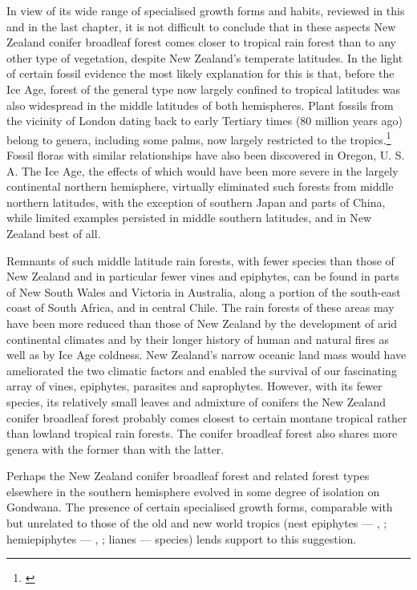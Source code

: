 In view of its wide range of specialised growth forms and habits, reviewed in this and in the last chapter, it is not difficult to conclude that in these aspects New Zealand conifer broadleaf forest comes closer to tropical rain forest than to any other type of vegetation, despite New Zealand's temperate latitudes.
In the light of certain fossil evidence the most likely explanation for this is that, before the Ice Age, forest of the general type now largely confined to tropical latitudes was also widespread in the middle latitudes of both hemispheres.
Plant fossils from the vicinity of London dating back to early Tertiary times (80 million years ago) belong to genera, including some palms, now largely restricted to the tropics.\footnote{\cite{chandler1964lower}}
Fossil floras with similar relationships have also been discovered in Oregon, U.
S.
A.
The Ice Age, the effects of which would have been more severe in the largely continental northern hemisphere, virtually eliminated such forests from middle northern latitudes, with the exception of southern Japan and parts of China, while limited examples persisted in middle southern latitudes, and in New Zealand best of all.

Remnants of such middle latitude rain forests, with fewer species than those of New Zealand and in particular fewer vines and epiphytes, can be found in parts of New South Wales and Victoria in Australia, along a portion of the south-east coast of South Africa, and in central Chile.
The rain forests of these areas may have been more reduced than those of New Zealand by the development of arid continental climates and by their longer history of human and natural fires as well as by Ice Age coldness.
New Zealand's narrow oceanic land mass would have ameliorated the two climatic factors and enabled the survival of our fascinating array of vines, epiphytes, parasites and saprophytes.
However, with its fewer species, its relatively small leaves and admixture of conifers the New Zealand conifer broadleaf forest probably comes closest to certain montane tropical rather than lowland tropical rain forests.
The conifer broadleaf forest also shares more genera with the former than with the latter.

Perhaps the New Zealand conifer broadleaf forest and related forest types elsewhere in the southern hemisphere evolved in some degree of isolation on Gondwana.
The presence of certain specialised growth forms, comparable with but unrelated to those of the old and new world tropics (nest epiphytes — , ; hemiepiphytes — , ; lianes —  species) lends support to this suggestion.


